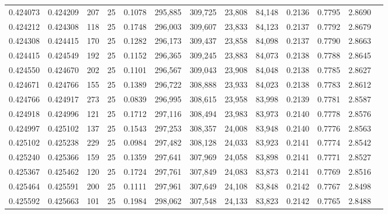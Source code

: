 \begin{tabular}{rrrrrrrrrrrrr}
0.424073 & 0.424209 &   207 &  25 &                                     0.1078 & 295,885 & 309,725 &  23,808 &  84,148 & 0.2136 & 0.7795 & 2.8690 \\
0.424212 & 0.424308 &   118 &  25 &                                     0.1748 & 296,003 & 309,607 &  23,833 &  84,123 & 0.2137 & 0.7792 & 2.8679 \\
0.424308 & 0.424415 &   170 &  25 &                                     0.1282 & 296,173 & 309,437 &  23,858 &  84,098 & 0.2137 & 0.7790 & 2.8663 \\
0.424415 & 0.424549 &   192 &  25 &                                     0.1152 & 296,365 & 309,245 &  23,883 &  84,073 & 0.2138 & 0.7788 & 2.8645 \\
0.424550 & 0.424670 &   202 &  25 &                                     0.1101 & 296,567 & 309,043 &  23,908 &  84,048 & 0.2138 & 0.7785 & 2.8627 \\
0.424671 & 0.424766 &   155 &  25 &                                     0.1389 & 296,722 & 308,888 &  23,933 &  84,023 & 0.2138 & 0.7783 & 2.8612 \\
0.424766 & 0.424917 &   273 &  25 &                                     0.0839 & 296,995 & 308,615 &  23,958 &  83,998 & 0.2139 & 0.7781 & 2.8587 \\
0.424918 & 0.424996 &   121 &  25 &                                     0.1712 & 297,116 & 308,494 &  23,983 &  83,973 & 0.2140 & 0.7778 & 2.8576 \\
0.424997 & 0.425102 &   137 &  25 &                                     0.1543 & 297,253 & 308,357 &  24,008 &  83,948 & 0.2140 & 0.7776 & 2.8563 \\
0.425102 & 0.425238 &   229 &  25 &                                     0.0984 & 297,482 & 308,128 &  24,033 &  83,923 & 0.2141 & 0.7774 & 2.8542 \\
0.425240 & 0.425366 &   159 &  25 &                                     0.1359 & 297,641 & 307,969 &  24,058 &  83,898 & 0.2141 & 0.7771 & 2.8527 \\
0.425367 & 0.425462 &   120 &  25 &                                     0.1724 & 297,761 & 307,849 &  24,083 &  83,873 & 0.2141 & 0.7769 & 2.8516 \\
0.425464 & 0.425591 &   200 &  25 &                                     0.1111 & 297,961 & 307,649 &  24,108 &  83,848 & 0.2142 & 0.7767 & 2.8498 \\
0.425592 & 0.425663 &   101 &  25 &                                     0.1984 & 298,062 & 307,548 &  24,133 &  83,823 & 0.2142 & 0.7765 & 2.8488 \\

\end{tabular}
